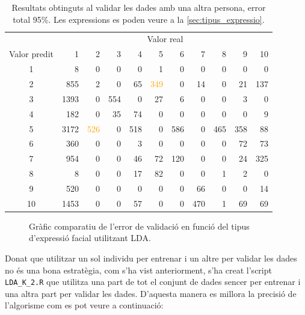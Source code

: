 \documentclass[a4paper]{article}
\begin{document}
\begin{table}[H]
	\centering
	\def\arraystretch{1.2}
	\begin{tabular}{|c|rrrrrrrrrr|}
		\hline
		& \multicolumn{10}{c|}{Valor real} \\
		Valor predit & 1 & 2 & 3 & 4 & 5 & 6 & 7 & 8 & 9 & 10 \\
		\hline
		1 & 8 & 0 & 0 & 0 & 1 & 0 & 0 & 0 & 0 & 0\\
		2 & 855 & 2 & 0 & 65 & \textcolor{Orange}{349} & 0 & 14 & 0 & 21 & 137\\
		3 & 1393 & 0 & 554 & 0 & 27 & 6 & 0 & 0 & 3 & 0\\
		4 & 182 & 0 & 35 & 74 & 0 & 0 & 0 & 0 & 0 & 9\\
		5 & 3172 & \textcolor{Orange}{526} & 0 & 518 & 0 & 586 & 0 & 465 & 358 & 88\\
		6 & 360 & 0 & 0 & 3 & 0 & 0 & 0 & 0 & 72 & 73\\
		7 & 954 & 0 & 0 & 46 & 72 & 120 & 0 & 0 & 24 & 325\\
		8 & 8 & 0 & 0 & 17 & 82 & 0 & 0 & 1 & 2 & 0\\
		9 & 520 & 0 & 0 & 0 & 0 & 0 & 66 & 0 & 0 & 14\\
		10 & 1453 & 0 & 0 & 57 & 0 & 0 & 470 & 1 & 69 & 69\\
		\hline
	\end{tabular}
\captionsetup{width=0.8\textwidth}
	\caption{Resultats obtinguts al validar les dades amb una altra persona, error total 95\%. Les expressions es poden veure a la \autoref{sec:tipus_expressio}.}
\end{table}

\begin{figure}[H]
	\centering
	\captionsetup{width=0.8\textwidth}
	\caption{Gràfic comparatiu de l'error de validació en funció del tipus d'expressió facial utilitzant LDA.}
\end{figure}

Donat que utilitzar un sol individu per entrenar i un altre per validar les dades no és una bona estratègia, com s'ha vist anteriorment, s'ha creat l'script \verb|LDA_K_2.R| que utilitza una part de tot el conjunt de dades sencer per entrenar i una altra part per validar les dades. D'aquesta manera es millora la precisió de l'algorisme com es pot veure a continuació:
\end{document}
